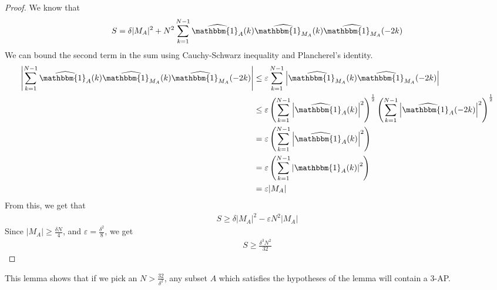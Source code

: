 \documentclass[12pt, titlepage]{article}
\theoremstyle{definition}
\newcommand{\vep}{\varepsilon}
\newcommand{\indi}{\mathbbm{1}}
\begin{document}
\begin{proof}
    We know that
    \begin{align*}
        S = \delta |M_A|^2 + N^2 \sum_{k=1}^{N-1} \widehat{\indi_A}(k) \widehat{\indi_{M_A}}(k) \widehat{\indi_{M_A}}(-2k)
    \end{align*}
    We can bound the second term in the sum using Cauchy-Schwarz inequality and Plancherel's identity.
    \begin{align*}
        \left| \sum_{k=1}^{N-1} \widehat{\indi_A}(k) \widehat{\indi_{M_A}}(k) \widehat{\indi_{M_A}}(-2k) \right|
        &\leq \vep \sum_{k=1}^{N-1}\left| \widehat{\indi_{M_A}}(k) \widehat{\indi_{M_A}}(-2k) \right| \\
        &\leq \vep \left( \sum_{k=1}^{N-1} \left| \widehat{\indi_A}(k) \right|^2 \right)^{\frac{1}{2}} \left( \sum_{k=1}^{N-1} \left| \widehat{\indi_A}(-2k) \right|^2 \right)^{\frac{1}{2}} \\
        &= \vep \left( \sum_{k=1}^{N-1} \left| \widehat{\indi_A}(k) \right|^2 \right) \\
        &= \vep \left( \sum_{k=1}^{N-1} \left| \indi_A(k) \right|^2 \right) \\
        &= \vep |M_A|
    \end{align*}
    From this, we get that
    \begin{align*}
        S \geq \delta |M_A|^2 - \vep N^2 |M_A|
    \end{align*}
    Since $|M_A| \geq \frac{\delta N}{4}$, and $\vep = \frac{\delta^2}{8}$, we get
    \begin{align*}
        S \geq \frac{\delta^3 N^2}{32}
    \end{align*}
\end{proof}
This lemma shows that if we pick an $N > \frac{32}{\delta^2}$, any subset $A$ which satisfies the hypotheses of the lemma will contain a $3$-AP.
\end{document}

